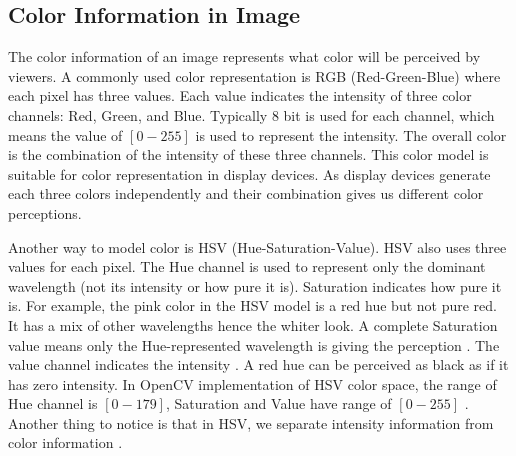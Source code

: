 \subsection*{Color Information in Image}
\label{subsection:hsv_color}

The color information of an image represents what color will be perceived by viewers. A commonly used color representation is RGB (Red-Green-Blue) where each pixel has three values. Each value indicates the intensity of three color channels: Red, Green, and Blue. Typically $8$ bit is used for each channel, which means the value of $[0-255]$ is used to represent the intensity. The overall color is the combination of the intensity of these three channels. This color model is suitable for color representation in display devices. As display devices generate each three colors independently and their combination gives us different color perceptions.

Another way to model color is HSV (Hue-Saturation-Value). HSV also uses three values for each pixel. The Hue channel is used to represent only the dominant wavelength (not its intensity or how pure it is). Saturation indicates how pure it is. For example, the pink color in the HSV model is a red hue but not pure red. It has a mix of other wavelengths hence the whiter look. A complete Saturation value means only the Hue-represented wavelength is giving the perception \cite{vadivel2005human}. The value channel indicates the intensity \cite{shuhua2010application,sural2002segmentation}. A red hue can be perceived as black as if it has zero intensity. In OpenCV implementation of HSV color space, the range of Hue channel is $[0-179]$, Saturation and Value have range of $[0-255]$ \cite{opencvHSV}. Another thing to notice is that in HSV, we separate intensity information from color information \cite{loesdau2014hue}.


